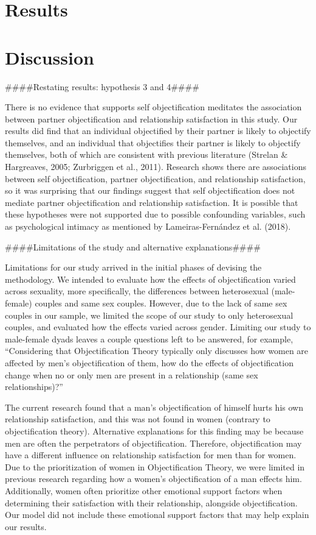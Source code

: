 \documentclass[
  man]{apa6}
\begin{document}
\hypertarget{results}{%
\section{Results}\label{results}}

\hypertarget{discussion}{%
\section{Discussion}\label{discussion}}

\#\#\#\#Restating results: hypothesis 3 and 4\#\#\#\#

There is no evidence that supports self objectification meditates the association between partner objectification and relationship satisfaction in this study. Our results did find that an individual objectified by their partner is likely to objectify themselves, and an individual that objectifies their partner is likely to objectify themselves, both of which are consistent with previous literature (Strelan \& Hargreaves, 2005; Zurbriggen et al., 2011). Research shows there are associations between self objectification, partner objectification, and relationship satisfaction, so it was surprising that our findings suggest that self objectification does not mediate partner objectification and relationship satisfaction. It is possible that these hypotheses were not supported due to possible confounding variables, such as psychological intimacy as mentioned by Lameiras-Fernández et al. (2018).

\#\#\#\#Limitations of the study and alternative explanations\#\#\#\#

Limitations for our study arrived in the initial phases of devising the methodology. We intended to evaluate how the effects of objectification varied across sexuality, more specifically, the differences between heterosexual (male-female) couples and same sex couples. However, due to the lack of same sex couples in our sample, we limited the scope of our study to only heterosexual couples, and evaluated how the effects varied across gender. Limiting our study to male-female dyads leaves a couple questions left to be answered, for example, ``Considering that Objectification Theory typically only discusses how women are affected by men's objectification of them, how do the effects of objectification change when no or only men are present in a relationship (same sex relationships)?''

The current research found that a man's objectification of himself hurts his own relationship satisfaction, and this was not found in women (contrary to objectification theory). Alternative explanations for this finding may be because men are often the perpetrators of objectification. Therefore, objectification may have a different influence on relationship satisfaction for men than for women. Due to the prioritization of women in Objectification Theory, we were limited in previous research regarding how a women's objectification of a man effects him. Additionally, women often prioritize other emotional support factors when determining their satisfaction with their relationship, alongside objectification. Our model did not include these emotional support factors that may help explain our results.
\end{document}
